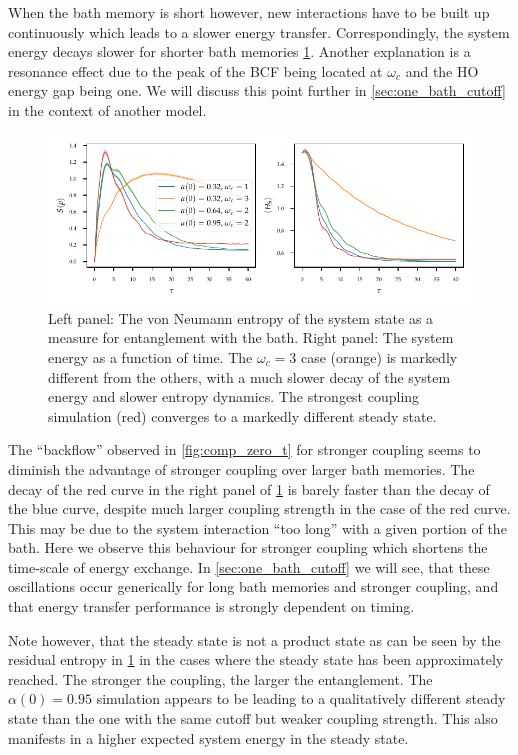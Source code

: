 When the bath memory is short however,
new interactions have to be built up continuously which leads to a
slower energy transfer. Correspondingly, the system energy decays
slower for shorter bath memories \cref{fig:ho_zero_entropy}. Another
explanation is a resonance effect due to the peak of the BCF being
located at \(ω_c\) and the HO energy gap being one. We will discuss
this point further in \cref{sec:one_bath_cutoff} in the context of
another model.

\begin{figure}[htp]
  \centering
  \includegraphics{figs/analytic_comp/entropy_zero.pdf}
  \caption{\label{fig:ho_zero_entropy} Left panel: The von Neumann
    entropy of the system state as a measure for entanglement with the
    bath. Right panel: The system energy as a function of time. The
    \(ω_{c}=3\) case (orange) is markedly different from the others,
    with a much slower decay of the system energy and slower entropy
    dynamics. The strongest coupling simulation (red) converges to a
    markedly different steady state.}
\end{figure}
The ``backflow'' observed in \cref{fig:comp_zero_t} for stronger
coupling seems to diminish the advantage of stronger coupling over
larger bath memories. The decay of the red curve in the right panel of
\cref{fig:ho_zero_entropy} is barely faster than the decay of the blue
curve, despite much larger coupling strength in the case of the red
curve. This may be due to the system interaction ``too long'' with a
given portion of the bath. Here we observe this behaviour for stronger
coupling which shortens the time-scale of energy exchange. In
\cref{sec:one_bath_cutoff} we will see, that these oscillations occur
generically for long bath memories and stronger coupling, and that
energy transfer performance is strongly dependent on timing.

Note however, that the steady state is not a product state as can be
seen by the residual entropy in \cref{fig:ho_zero_entropy} in the
cases where the steady state has been approximately reached. The
stronger the coupling, the larger the entanglement. The \(α(0)=0.95\)
simulation appears to be leading to a qualitatively different steady
state than the one with the same cutoff but weaker coupling
strength. This also manifests in a higher expected system energy in
the steady state.

